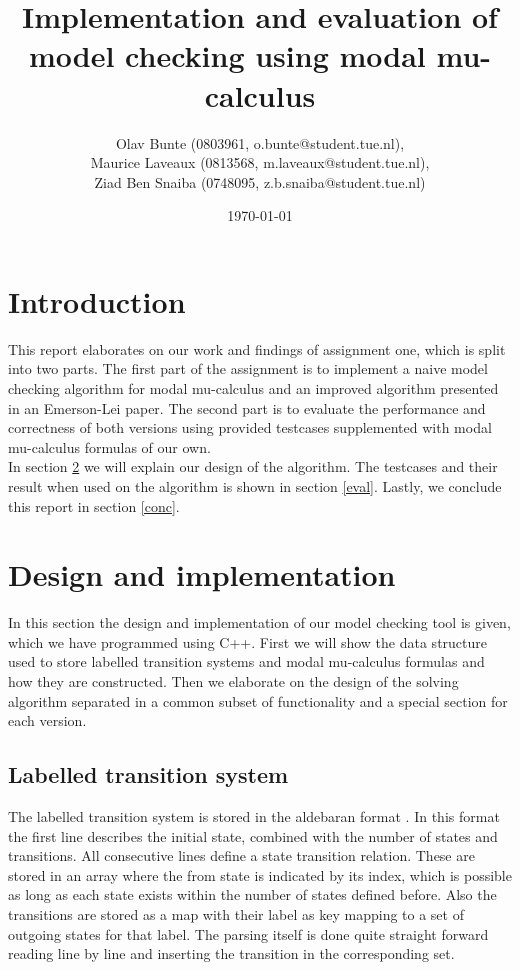 \documentclass[10pt,a4paper]{article}
\title{Implementation and evaluation of model checking using modal mu-calculus}
\author{Olav Bunte (0803961, o.bunte@student.tue.nl),\\
Maurice Laveaux (0813568, m.laveaux@student.tue.nl),\\
Ziad Ben Snaiba (0748095, z.b.snaiba@student.tue.nl)}
\date{\today}
\begin{document}
\maketitle

\section{Introduction}
This report elaborates on our work and findings of assignment one, which is split into two parts. The first part of the assignment is to implement a naive model checking algorithm for modal mu-calculus and an improved algorithm presented in an Emerson-Lei paper. The second part is to evaluate the performance and correctness of  both versions using provided testcases supplemented with modal mu-calculus formulas of our own.\\
In section \ref{design} we will explain our design of the algorithm. The testcases and their result when used on the algorithm is shown in section \ref{eval}. Lastly, we conclude this report in section \ref{conc}.

\section{Design and implementation}\label{design}
In this section the design and implementation of our model checking tool is given, which we have programmed using C++. First we will show the data structure used to store labelled transition systems and modal mu-calculus formulas and how they are constructed. Then we elaborate on the design of the solving algorithm separated in a common subset of functionality and a special section for each version.

\subsection{Labelled transition system}
The labelled transition system is stored in the aldebaran format \cite{aldebaran}. In this format the first line describes the initial state, combined with the number of states and transitions. All consecutive lines define a state transition relation. These are stored in an array where the from state is indicated by its index, which is possible as long as each state exists within the number of states defined before. Also the transitions are stored as a map with their label as key mapping to a set of outgoing states for that label. The parsing itself is done quite straight forward reading line by line and inserting the transition in the corresponding set.
\end{document}
